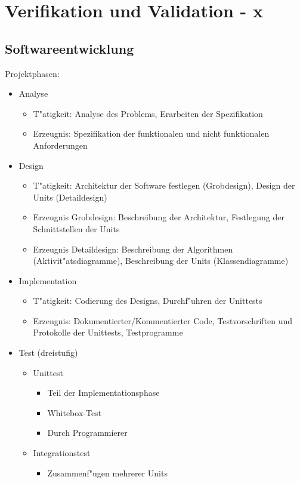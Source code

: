 \section{Verifikation und Validation - x}
\subsection{Softwareentwicklung}
Projektphasen:
\begin{itemize}
\item Analyse
	\begin{itemize}
		\item T"atigkeit: Analyse des Problems, Erarbeiten der Spezifikation
		\item Erzeugnis: Spezifikation der funktionalen und nicht funktionalen Anforderungen 
	\end{itemize}
\item Design 
		\begin{itemize}
			\item T"atigkeit: Architektur der Software festlegen (Grobdesign), Design der Units (Detaildesign)
			\item Erzeugnis Grobdesign: Beschreibung der Architektur, Festlegung der Schnittstellen der Units
			\item Erzeugnis Detaildesign: Beschreibung der Algorithmen (Aktivit"atsdiagramme), Beschreibung der Units (Klassendiagramme) 
		\end{itemize}
\item Implementation 
	\begin{itemize}
		\item T"atigkeit: Codierung des Designs, Durchf"uhren der Unittests
		\item Erzeugnis: Dokumentierter/Kommentierter Code, Testvorschriften und Protokolle der Unittests, Testprogramme  
	\end{itemize}
\item Test (dreistufig)
	\begin{itemize}
		\item Unittest
			\begin{itemize}
				\item Teil der Implementationsphase
				\item Whitebox-Test
				\item Durch Programmierer
			\end{itemize}
		\item Integrationstest
				\begin{itemize}
						\item Zusammenf"ugen mehrerer Units

\end{itemize}
\end{itemize}
\end{itemize}
